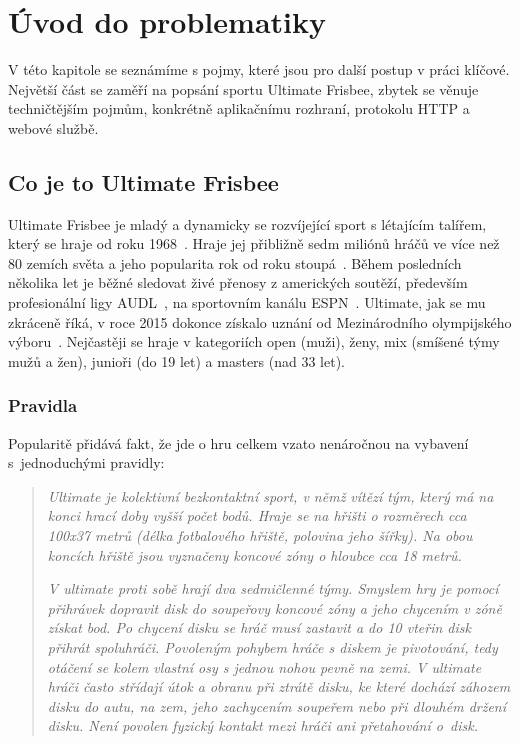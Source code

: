 \chapter{Úvod do problematiky}

V této kapitole se seznámíme s pojmy, které jsou pro další postup v práci klíčové. 
Největší část se zaměří na popsání sportu Ultimate Frisbee, zbytek se věnuje techničtějším pojmům,
konkrétně aplikačnímu rozhraní, protokolu HTTP a webové službě.

\section{Co je to Ultimate Frisbee}

Ultimate Frisbee je mladý a dynamicky se rozvíjející sport s létajícím talířem,
který se hraje od roku 1968~\cite{cald_ultimate}. Hraje jej přibližně sedm miliónů
hráčů ve více než 80 zemích světa a jeho popularita rok od roku stoupá~\cite{usa_ultimate}.
Během posledních několika let je běžné sledovat živé přenosy z amerických soutěží,
především profesionální ligy AUDL~\cite{audl}, na sportovním kanálu ESPN~\cite{espn}.
Ultimate, jak se mu zkráceně říká, v roce 2015 dokonce získalo
uznání od Mezinárodního olympijského výboru~\cite{cald_uznani}. Nejčastěji se hraje v kategoriích
open (muži), ženy, mix (smíšené týmy mužů a žen), junioři (do 19 let) a masters (nad 33 let).

\subsection{Pravidla}

Popularitě přidává fakt, že jde o hru celkem vzato nenáročnou na vybavení s~jednoduchými pravidly:

\begin{quote}
  \textit{
    Ultimate je kolektivní bezkontaktní sport, v němž vítězí tým, který má na konci hrací doby
    vyšší počet bodů. Hraje se na hřišti o rozměrech cca 100x37 metrů (délka fotbalového hřiště,
    polovina jeho šířky). Na obou koncích hřiště jsou vyznačeny koncové zóny o hloubce cca 18 metrů.
  }
  
  \textit{
    V ultimate proti sobě hrají dva sedmičlenné týmy. Smyslem hry je pomocí přihrávek dopravit disk
    do soupeřovy koncové zóny a jeho chycením v zóně získat bod. Po chycení disku se hráč musí
    zastavit a do 10 vteřin disk přihrát spoluhráči. Povoleným pohybem hráče s diskem je pivotování,
    tedy otáčení se kolem vlastní osy s jednou nohou pevně na zemi. V ultimate hráči často střídají
    útok a obranu při ztrátě disku, ke které dochází záhozem disku do autu, na zem, jeho zachycením
    soupeřem nebo při dlouhém držení disku. Není povolen fyzický kontakt mezi hráči ani přetahování
    o~disk.~\cite{cald_ultimate}
  }
\end{quote}

